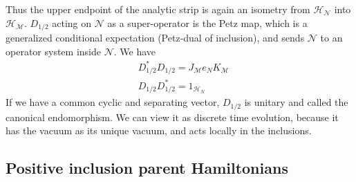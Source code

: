 \documentclass[a4paper,11pt]{article}
\theoremstyle{definition}
\newcommand{\nn}{\nonumber}
\newcommand{\mN}{\mathcal{N}}
\newcommand{\mH}{\mathcal{H}}
\newcommand{\mM}{\mathcal{M}}
\begin{document}
Thus the upper endpoint of the analytic strip is again an isometry from
$\mH_{\mN}$ into $\mH_{\mM}$. $D_{1/2}$ acting on $\mN$ as a super-operator is the Petz map, which is a generalized conditional expectation (Petz-dual of inclusion), and sends $\mN$ to an operator system inside $\mN$. We have
\begin{align}
    &D_{1/2}^*D_{1/2}=J_\mM e_N K_\mM\nn\\
    &D_{1/2}D_{1/2}^*=1_{\mH_N}
\end{align}
If we have a common cyclic and separating vector, $D_{1/2}$ is unitary and called the canonical endomorphism. We can view it as discrete time evolution, because it has the vacuum as its unique vacuum, and acts locally in the inclusions. 



\subsection{Positive inclusion parent Hamiltonians}
\end{document}

